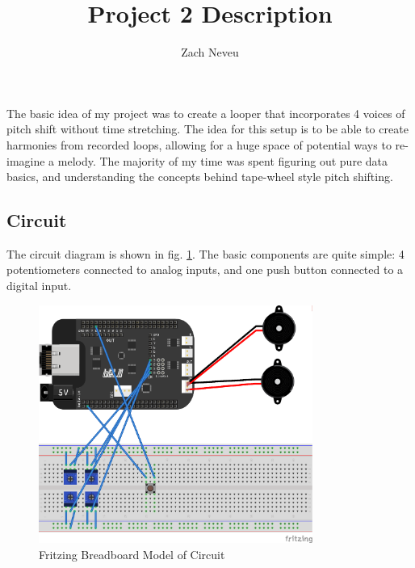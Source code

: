 \documentclass[12pt, letter]{article}
\author{Zach Neveu}
\title{ Project 2 Description }
\begin{document}
\maketitle

The basic idea of my project was to create a looper that incorporates 4 voices of pitch shift without time stretching. The idea for this setup is to be able to create harmonies from recorded loops, allowing for a huge space of potential ways to re-imagine a melody. The majority of my time was spent figuring out pure data basics, and understanding the concepts behind tape-wheel style pitch shifting.

\subsection*{Circuit}
The circuit diagram is shown in fig. \ref{fig:circuit}. The basic components are quite simple: 4 potentiometers connected to analog inputs, and one push button connected to a digital input.

\begin{figure}[h]
	\centering
	\includegraphics[width=0.8\textwidth]{../p2_schematic.png}
	\caption{Fritzing Breadboard Model of Circuit}
	\label{fig:circuit}
\end{figure}
\end{document}
